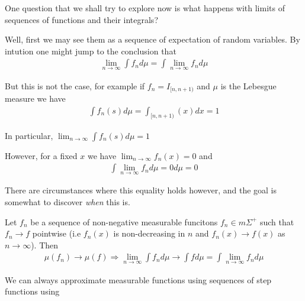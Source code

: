 \par\bigskip
\noindent One question that we shall try to explore now is what happens with limits of sequences of functions and their integrals?\par
\noindent Well, first we may see them as a sequence of expectation of random variables. By intution one might jump to the conclusion that
\begin{equation*}
  \begin{gathered}
    \lim_{n\to\infty}\int f_n d\mu = \int\lim_{n\to\infty}f_n d\mu
  \end{gathered}
\end{equation*}\par
\noindent But this is not the case, for example if $f_n = I_{[n,n+1)}$ and $\mu$ is the Lebesgue measure we have
\begin{equation*}
  \begin{gathered}
    \int f_n(s) d\mu = \int_{[n,n+1)}(x)dx = 1
  \end{gathered}
\end{equation*}\par
\noindent In particular, $\lim_{n\to\infty}\int f_n(s)d\mu = 1$\par
\noindent However, for a fixed $x$ we have $\lim_{n\to\infty}f_n(x) = 0$ and
\begin{equation*}
  \begin{gathered}
    \int\lim_{n\to\infty}f_n d\mu = 0d\mu = 0 
  \end{gathered}
\end{equation*}
\par\bigskip
\noindent There are circumstances where this equality holds however, and the goal is somewhat to discover \textit{when} this is.
\par\bigskip
\begin{theo}{}
  Let $f_n$ be a sequence of non-negative measurable funcitons $f_n\in m\Sigma^+$ such that $f_n\to f$ pointwise (i.e $f_n(x)$ is non-decreasing in $n$ and $f_n(x)\to f(x)$ as $n\to\infty$). Then
  \begin{equation*}
    \begin{gathered}
      \mu(f_n)\to \mu(f)\Rightarrow \lim_{n\to\infty}\int f_n d\mu\to\int f d\mu = \int\lim_{n\to\infty}f_n d\mu
    \end{gathered}
  \end{equation*}
\end{theo}
\noindent We can always approximate measurable functions using sequences of step functions using
